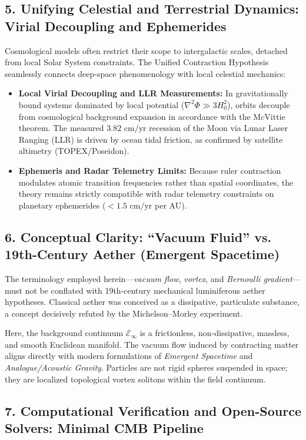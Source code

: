 \subsection*{5. Unifying Celestial and Terrestrial Dynamics: Virial Decoupling and Ephemerides}

Cosmological models often restrict their scope to intergalactic scales, detached from local Solar System constraints. The Unified Contraction Hypothesis seamlessly connects deep-space phenomenology with local celestial mechanics:
\begin{itemize}
    \item \textbf{Local Virial Decoupling and LLR Measurements:} In gravitationally bound systems dominated by local potential ($\nabla^2\Phi \gg 3H_0^2$), orbits decouple from cosmological background expansion in accordance with the McVittie theorem. The measured $3.82\text{ cm/yr}$ recession of the Moon via Lunar Laser Ranging (LLR) is driven by ocean tidal friction, as confirmed by satellite altimetry (TOPEX/Poseidon).
    \item \textbf{Ephemeris and Radar Telemetry Limits:} Because ruler contraction modulates atomic transition frequencies rather than spatial coordinates, the theory remains strictly compatible with radar telemetry constraints on planetary ephemerides ($< 1.5\text{ cm/yr}$ per AU).
\end{itemize}

\subsection*{6. Conceptual Clarity: ``Vacuum Fluid'' vs. 19th-Century Aether (Emergent Spacetime)}

The terminology employed herein---\textit{vacuum flow}, \textit{vortex}, and \textit{Bernoulli gradient}---must not be conflated with 19th-century mechanical luminiferous aether hypotheses. Classical aether was conceived as a dissipative, particulate substance, a concept decisively refuted by the Michelson--Morley experiment.

Here, the background continuum $\mathcal{E}_\infty$ is a frictionless, non-dissipative, massless, and smooth Euclidean manifold. The vacuum flow induced by contracting matter aligns directly with modern formulations of \textit{Emergent Spacetime} and \textit{Analogue/Acoustic Gravity}. Particles are not rigid spheres suspended in space; they are localized topological vortex solitons within the field continuum.

\subsection*{7. Computational Verification and Open-Source Solvers: Minimal CMB Pipeline}


